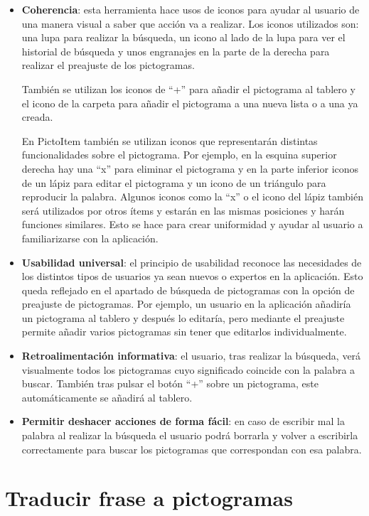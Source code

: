 \begin{itemize}
	\item \textbf{Coherencia}: esta herramienta hace usos de iconos para ayudar al usuario de una manera visual a saber que acción va a realizar. Los iconos utilizados son: una lupa para realizar la búsqueda, un icono al lado de la lupa para ver el historial de búsqueda y unos engranajes en la parte de la derecha para realizar el preajuste de los pictogramas.
	
	También se utilizan los iconos de “+” para añadir el pictograma al tablero y el icono de la carpeta para añadir el pictograma a una nueva lista o a una ya creada.
	
	En PictoItem también se utilizan iconos que representarán distintas funcionalidades sobre el pictograma. Por ejemplo, en la esquina superior derecha hay una “x” para eliminar el pictograma y en la parte inferior iconos de un lápiz para editar el pictograma y un icono de un triángulo para reproducir la palabra. Algunos iconos como la “x” o el icono del lápiz también será utilizados por otros ítems y estarán en las mismas posiciones y harán funciones similares. Esto se hace para crear uniformidad y ayudar al usuario a familiarizarse con la aplicación.
	
	
	\item \textbf{Usabilidad universal}: el principio de usabilidad reconoce las necesidades de los distintos tipos de usuarios ya sean nuevos o expertos en la aplicación. Esto queda reflejado en el apartado de búsqueda de pictogramas con la opción de preajuste de pictogramas. Por ejemplo, un usuario en la aplicación añadiría un pictograma al tablero y después lo editaría, pero mediante el preajuste permite añadir varios pictogramas sin tener que editarlos individualmente.
	
	\item \textbf{Retroalimentación informativa}: el usuario, tras realizar la búsqueda, verá visualmente todos los pictogramas cuyo significado coincide con la palabra a buscar. También tras pulsar el botón “+” sobre un pictograma, este automáticamente se añadirá al tablero.
	
	
	\item \textbf{Permitir deshacer acciones de forma fácil}: en caso de escribir mal la palabra al realizar la búsqueda el usuario podrá borrarla y volver a escribirla correctamente para buscar los pictogramas que correspondan con esa palabra.
\end{itemize}


\section{Traducir frase a pictogramas}

